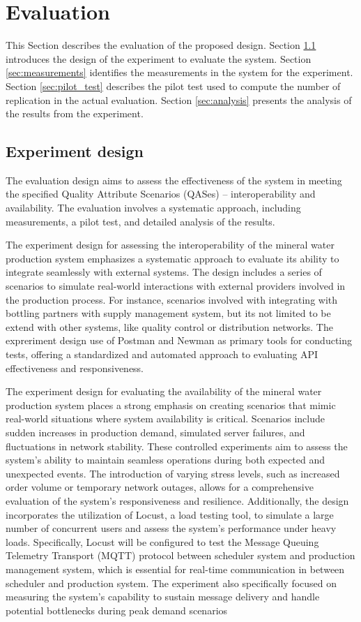 \documentclass[conference]{IEEEtran}
\begin{document}
\section{Evaluation}
\label{sec:evaluation}

This Section describes the evaluation of the proposed design.
Section \ref{sec:design} introduces the design of the experiment to evaluate the system.
Section \ref{sec:measurements} identifies the measurements in the system for the experiment.
Section \ref{sec:pilot_test} describes the pilot test used to compute the number of replication in the actual evaluation. 
Section \ref{sec:analysis} presents the analysis of the results from the experiment. 

 
\subsection{Experiment design}
\label{sec:design}
The evaluation design aims to assess the effectiveness of the system in meeting the specified Quality Attribute Scenarios (QASes) – interoperability and availability. The evaluation involves a systematic approach, including measurements, a pilot test, and detailed analysis of the results.

The experiment design for assessing the interoperability of the mineral water production system emphasizes a systematic approach to evaluate its ability to integrate seamlessly with external systems. The design includes a series of scenarios to simulate real-world interactions with external providers involved in the production process. For instance, scenarios involved with integrating with bottling partners with supply management system, but its not limited to be extend with other systems, like quality control or distribution networks. The expreriment design use of Postman and Newman as primary tools for conducting tests, offering a standardized and automated approach to evaluating API effectiveness and responsiveness. 

The experiment design for evaluating the availability of the mineral water production system places a strong emphasis on creating scenarios that mimic real-world situations where system availability is critical. Scenarios include sudden increases in production demand, simulated server failures, and fluctuations in network stability. These controlled experiments aim to assess the system's ability to maintain seamless operations during both expected and unexpected events. The introduction of varying stress levels, such as increased order volume or temporary network outages, allows for a comprehensive evaluation of the system's responsiveness and resilience. Additionally, the design incorporates the utilization of Locust, a load testing tool, to simulate a large number of concurrent users and assess the system's performance under heavy loads. Specifically, Locust will be configured to test the Message Queuing Telemetry Transport (MQTT) protocol between scheduler system and production management system, which is essential for real-time communication in between scheduler and production system. The experiment also specifically focused on measuring the system's capability to sustain message delivery and handle potential bottlenecks during peak demand scenarios
\end{document}

